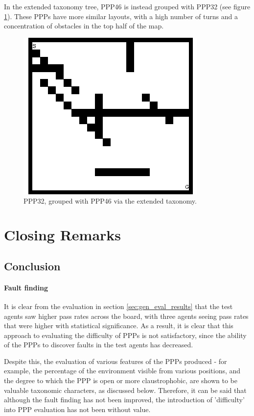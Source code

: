 \documentclass[authoryearcitations]{UoYCSproject}
\begin{document}
In the extended taxonomy tree, PPP46 is instead grouped with PPP32 (see figure \ref{fig:ppp_32}). These PPPs have more similar layouts, with a high number of turns and a concentration of obstacles in the top half of the map.

\begin{figure}
\graphicspath{ {EvalPics/} }
\includegraphics[scale=0.65]{ppp32.png}
\caption{PPP32, grouped with PPP46 via the extended taxonomy.}
\label{fig:ppp_32}
\end{figure}

\part{Closing Remarks}
\label{sec:close}
\chapter{Conclusion}
\label{cha:conclusion}
\subsection{Fault finding}
\label{sec:conc_fault}
It is clear from the evaluation in section \ref{sec:gen_eval_results} that the test agents saw higher pass rates across the board, with three agents seeing pass rates that were higher with statistical significance. As a result, it is clear that this approach to evaluating the difficulty of PPPs is not satisfactory, since the ability of the PPPs to discover faults in the test agents has decreased.

Despite this, the evaluation of various features of the PPPs produced - for example, the percentage of the environment visible from various positions, and the degree to which the PPP is open or more claustrophobic, are shown to be valuable taxonomic characters, as discussed below. Therefore, it can be said that although the fault finding has not been improved, the introduction of 'difficulty' into PPP evaluation has not been without value.
\end{document}
